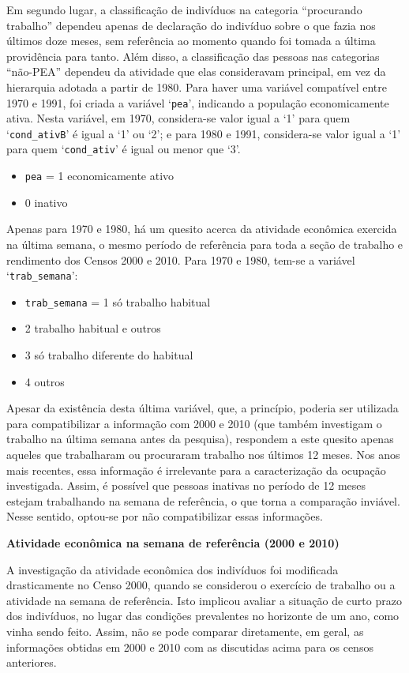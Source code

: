 \documentclass[12pt,a4paper]{article}
\newcommand{\vr}[1]{\texttt{#1}}
\begin{document}
Em segundo lugar, a classificação de indivíduos na categoria “procurando trabalho” dependeu apenas de declaração do indivíduo sobre o que fazia nos últimos doze meses, sem referência ao momento quando foi tomada a última providência para tanto. Além disso, a classificação das pessoas nas categorias “não-PEA” dependeu da atividade que elas consideravam principal, em vez da hierarquia adotada a partir de 1980. Para haver uma variável compatível entre 1970 e 1991, foi criada a variável ‘\vr{pea}’, indicando a população economicamente ativa. Nesta variável, em 1970, considera-se valor igual a ‘1’ para quem ‘\vr{cond\_ativB}’ é igual a ‘1’ ou ‘2’; e para 1980 e 1991, considera-se valor igual a ‘1’ para quem ‘\vr{cond\_ativ}’ é igual ou menor que ‘3’.
\begin{itemize}
  \item \vr{pea} = 1 economicamente ativo
  \item 0 inativo
\end{itemize}

Apenas para 1970 e 1980, há um quesito acerca da atividade econômica exercida na última semana, o mesmo período de referência para toda a seção de trabalho e rendimento dos Censos 2000 e 2010. Para 1970 e 1980, tem-se a variável ‘\vr{trab\_semana}’:
\begin{itemize}
  \item \vr{trab\_semana} = 1 só trabalho habitual
  \item 2 trabalho habitual e outros
  \item 3 só trabalho diferente do habitual
  \item 4 outros
\end{itemize}

Apesar da existência desta última variável, que, a princípio, poderia ser utilizada para compatibilizar a informação com 2000 e 2010 (que também investigam o trabalho na última semana antes da pesquisa), respondem a este quesito apenas aqueles que trabalharam ou procuraram trabalho nos últimos 12 meses. Nos anos mais recentes, essa informação é irrelevante para a caracterização da ocupação investigada. Assim, é possível que pessoas inativas no período de 12 meses estejam trabalhando na semana de referência, o que torna a comparação inviável. Nesse sentido, optou-se por não compatibilizar essas informações.

\medskip
\textbf{Atividade econômica na semana de referência (2000 e 2010)}

A investigação da atividade econômica dos indivíduos foi modificada drasticamente no Censo 2000, quando se considerou o exercício de trabalho ou a atividade na semana de referência. Isto implicou avaliar a situação de curto prazo dos indivíduos, no lugar das condições prevalentes no horizonte de um ano, como vinha sendo feito. Assim, não se pode comparar diretamente, em geral, as informações obtidas em 2000 e 2010 com as discutidas acima para os censos anteriores.
\end{document}
